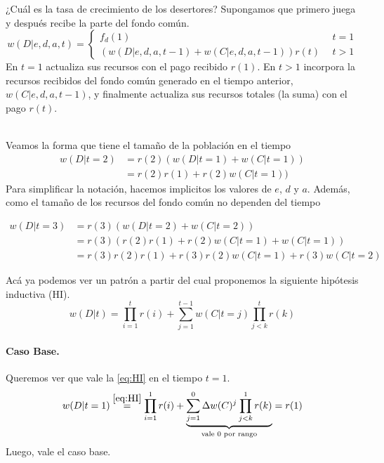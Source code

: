 \documentclass[a4paper,10pt]{article}
\begin{document}
¿Cuál es la tasa de crecimiento de los desertores?
Supongamos que primero juega y después recibe la parte del fondo común.
\begin{equation}
w(D|e,d,a,t) =
\begin{cases}
 f_d(1) & \ \  t=1 \\
 (w(D|e,d,a,t-1) + w(C|e,d,a,t-1)) r(t) & \ \  t>1
\end{cases}
\end{equation}
En $t=1$ actualiza sus recursos con el pago recibido $r(1)$.
En $t>1$ incorpora la recursos recibidos del fondo común generado en el tiempo anterior, $w(C|e,d,a,t-1)$, y finalmente actualiza sus recursos totales (la suma) con el pago $r(t)$.

\\

Veamos la forma que tiene el tamaño de la población en el tiempo
\begin{align}
w(D|t=2) & = r(2) (w(D|t=1) + w(C|t=1)) \\
& = r(2)r(1) + r(2)w(C|t=1))
\end{align}
Para simplificar la notación, hacemos implicitos los valores de $e$, $d$ y $a$.
Además, como el tamaño de los recursos del fondo común no dependen del tiempo

\begin{align}
w(D|t=3) & = r(3) (w(D|t=2)+w(C|t=2)) \\
& = r(3) (r(2)r(1) + r(2)w(C|t=1) + w(C|t=1) ) \\
& = r(3)r(2)r(1) + r(3)r(2)w(C|t=1) + r(3)w(C|t=2) 
\end{align}

Acá ya podemos ver un patrón a partir del cual proponemos la siguiente hipótesis inductiva (HI).
\begin{equation} \label{eq:HI} \tag{HI} 
w(D|t) = \prod^t_{i=1} r(i) + \sum^{t-1}_{j=1} w(C|t=j)
\prod^t_{j<k} r(k)
\end{equation}

\paragraph{Caso Base.} Queremos ver que vale la \ref{eq:HI} en el tiempo $t=1$.
\begin{equation} 
w(D|t=1) \overset{\ref{eq:HI}}{=} \prod^1_{i=1} r(i) + \underbrace{\sum^{0}_{j=1} \Delta w(C)^j \prod^1_{j<k} r(k) }_{\text{vale $0$ por rango}} = r(1)
\end{equation}
Luego, vale el caso base.
\end{document}
